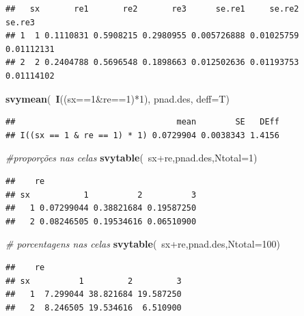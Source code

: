 \documentclass[]{book}
\newenvironment{Shaded}{\begin{snugshade}}{\end{snugshade}}
\newcommand{\KeywordTok}[1]{\textcolor[rgb]{0.13,0.29,0.53}{\textbf{{#1}}}}
\newcommand{\DataTypeTok}[1]{\textcolor[rgb]{0.13,0.29,0.53}{{#1}}}
\newcommand{\DecValTok}[1]{\textcolor[rgb]{0.00,0.00,0.81}{{#1}}}
\newcommand{\StringTok}[1]{\textcolor[rgb]{0.31,0.60,0.02}{{#1}}}
\newcommand{\CommentTok}[1]{\textcolor[rgb]{0.56,0.35,0.01}{\textit{{#1}}}}
\newcommand{\NormalTok}[1]{{#1}}
\numberwithin{example}{chapter}
\numberwithin{remark}{chapter}
\numberwithin{definition}{chapter}
\begin{document}
\begin{verbatim}
##   sx       re1       re2       re3      se.re1     se.re2     se.re3
## 1  1 0.1110831 0.5908215 0.2980955 0.005726888 0.01025759 0.01112131
## 2  2 0.2404788 0.5696548 0.1898663 0.012502636 0.01193753 0.01114102
\end{verbatim}

\begin{Shaded}
\begin{Highlighting}[]
\KeywordTok{svymean}\NormalTok{(~}\KeywordTok{I}\NormalTok{((sx==}\DecValTok{1}\NormalTok{&re==}\DecValTok{1}\NormalTok{)*}\DecValTok{1}\NormalTok{), pnad.des, }\DataTypeTok{deff=}\NormalTok{T)}
\end{Highlighting}
\end{Shaded}

\begin{verbatim}
##                                 mean        SE   DEff
## I((sx == 1 & re == 1) * 1) 0.0729904 0.0038343 1.4156
\end{verbatim}

\begin{Shaded}
\begin{Highlighting}[]
\CommentTok{#proporções nas celas}
\KeywordTok{svytable}\NormalTok{(~sx+re,pnad.des,}\DataTypeTok{Ntotal=}\DecValTok{1}\NormalTok{)}
\end{Highlighting}
\end{Shaded}

\begin{verbatim}
##    re
## sx           1          2          3
##   1 0.07299044 0.38821684 0.19587250
##   2 0.08246505 0.19534616 0.06510900
\end{verbatim}

\begin{Shaded}
\begin{Highlighting}[]
\CommentTok{# porcentagens nas celas}
\KeywordTok{svytable}\NormalTok{(~sx+re,pnad.des,}\DataTypeTok{Ntotal=}\DecValTok{100}\NormalTok{)}
\end{Highlighting}
\end{Shaded}

\begin{verbatim}
##    re
## sx          1         2         3
##   1  7.299044 38.821684 19.587250
##   2  8.246505 19.534616  6.510900
\end{verbatim}

\begin{Shaded}
\end{Shaded}
\end{document}
